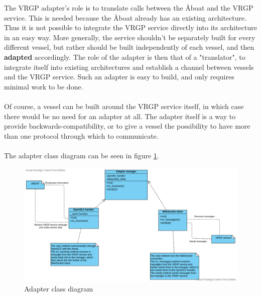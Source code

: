 The VRGP adapter's role is to translate calls between the Åboat and the VRGP service. This is needed because the Åboat already has an existing architecture. Thus it is not possible to integrate the VRGP service directly into its architecture in an easy way. More generally, the service shouldn't be separately built for every different vessel, but rather should be built independently of each vessel, and then \textbf{adapted} accordingly. The role of the adapter is then that of a "translator", to integrate itself into existing architectures and establish a channel between vessels and the VRGP service. Such an adapter is easy to build, and only requires minimal work to be done.
\\\\
Of course, a vessel can be built around the VRGP service itself, in which case there would be no need for an adapter at all. The adapter itself is a way to provide backwards-compatibility, or to give a vessel the possibility to have more than one protocol through which to communicate.
\\\\
The adapter class diagram can be seen in figure \ref{fig:adapter-class-diagram}.

\begin{figure}[ht]
	\centering
	\includegraphics[width=\linewidth]{diagrams/ClassDiagramAdapter}
	\caption{Adapter class diagram}
	\label{fig:adapter-class-diagram}
\end{figure}
